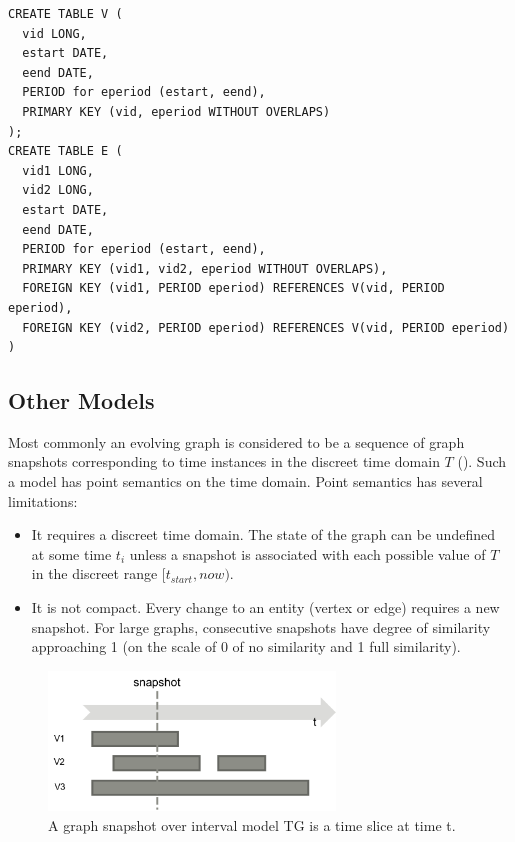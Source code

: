 \begin{small}
\begin{verbatim}
CREATE TABLE V (
  vid LONG,
  estart DATE,
  eend DATE,
  PERIOD for eperiod (estart, eend),
  PRIMARY KEY (vid, eperiod WITHOUT OVERLAPS)
);
CREATE TABLE E (
  vid1 LONG,
  vid2 LONG,
  estart DATE,
  eend DATE,
  PERIOD for eperiod (estart, eend),
  PRIMARY KEY (vid1, vid2, eperiod WITHOUT OVERLAPS),
  FOREIGN KEY (vid1, PERIOD eperiod) REFERENCES V(vid, PERIOD eperiod),
  FOREIGN KEY (vid2, PERIOD eperiod) REFERENCES V(vid, PERIOD eperiod)
)
\end{verbatim}
\end{small}


\subsection{Other Models}
\label{sec:model:other}

Most commonly an evolving graph is considered to be a sequence of
graph snapshots corresponding to time instances in the discreet time
domain $T$ (\cite{Khurana2013,DBLP:journals/tos/MiaoHLWYZPCC15}).
Such a model has point semantics on the time domain.  Point semantics
has several limitations:

\begin{itemize}[noitemsep,topsep=0pt]
\item It requires a discreet time domain.  The state of the graph can
  be undefined at some time $t_i$ unless a snapshot is associated with
  each possible value of $T$ in the discreet range $[t_{start}, now)$.
\item It is not compact.  Every change to an entity (vertex or edge)
  requires a new snapshot.  For large graphs, consecutive snapshots
  have degree of similarity approaching 1 (on the scale of 0 of no
  similarity and 1 full similarity).
\end{itemize}

\begin{figure}[h]
\includegraphics[width=3in]{figs/getsnap.pdf}
\caption{A graph snapshot over interval model TG is a time slice at time t.}
\label{fig:getsnap}
\end{figure}

